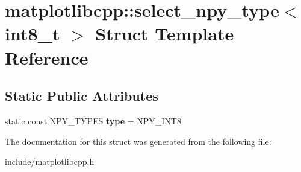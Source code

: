 \hypertarget{structmatplotlibcpp_1_1select__npy__type_3_01int8__t_01_4}{}\section{matplotlibcpp\+:\+:select\+\_\+npy\+\_\+type$<$ int8\+\_\+t $>$ Struct Template Reference}
\label{structmatplotlibcpp_1_1select__npy__type_3_01int8__t_01_4}
\subsection*{Static Public Attributes}
\begin{DoxyCompactItemize}
\item 
static const N\+P\+Y\+\_\+\+T\+Y\+P\+ES {\bfseries type} = N\+P\+Y\+\_\+\+I\+N\+T8\hypertarget{structmatplotlibcpp_1_1select__npy__type_3_01int8__t_01_4_a74836a19458ed32ca8948a4337364eae}{}\label{structmatplotlibcpp_1_1select__npy__type_3_01int8__t_01_4_a74836a19458ed32ca8948a4337364eae}

\end{DoxyCompactItemize}


The documentation for this struct was generated from the following file\+:\begin{DoxyCompactItemize}
\item 
include/matplotlibcpp.\+h\end{DoxyCompactItemize}
